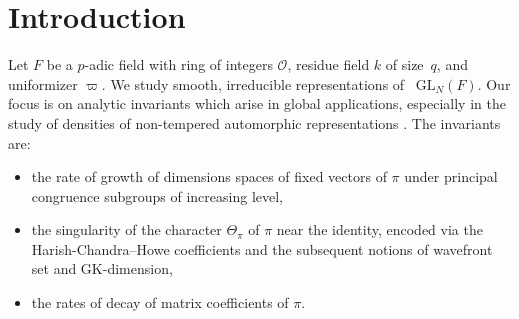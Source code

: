 \documentclass{amsart}
\newcommand{\mc}[1]{\mathcal{#1}}
\newcommand{\GL}{\mathrm{GL}}
\newcommand{\1}{\m 1}
\theoremstyle{remark}
\theoremstyle{definition}
\numberwithin{equation}{subsection}
\newcommand{\red}[1]{\textcolor{red}{#1}}
\newcommand{\blue}[1]{\textcolor{blue}{#1}}
\begin{document}

\tableofcontents

\section{Introduction}

Let $F$ be a $p$-adic field with ring of integers $\mc O$, residue field $k$ of size~$q$, and uniformizer $\varpi$. We study smooth, irreducible representations of ~$\GL_N(F)$. Our focus is on analytic invariants which arise in global applications, especially in the study of densities of non-tempered automorphic representations \cite{SX91, HK93, Mar14, MS19, Blo19, DGG22, EP22, AB24, DEP}%
. The invariants are:
\begin{itemize}
    \item[(i)] the rate of growth of dimensions spaces of fixed vectors of $\pi$ under principal congruence subgroups of increasing level,%
    \item[(ii)] the singularity of the character $\Theta_\pi$ of $\pi$ near the identity, encoded via the Harish-Chandra--Howe coefficients and the subsequent notions of wavefront set and GK-dimension,
    \item[(iii)] the rates of decay of matrix coefficients of $\pi$. %
\end{itemize}

\end{document}
